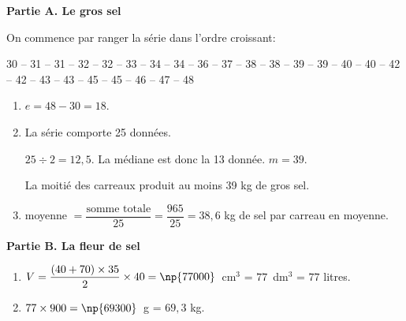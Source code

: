 
\medskip

\textbf{Partie A. Le gros sel}

\medskip

On commence par ranger la série dans l'ordre croissant:

30 -- 31 -- 31 -- 32 -- 32 -- 33 -- 34 -- 34 -- 36 -- 37 -- 38 -- 38 -- 39 -- 39 -- 40 -- 40 -- 42 -- 42 -- 43 -- 43 -- 45 -- 45 -- 46 -- 47 -- 48

\medskip

\begin{enumerate}
\item $e = 48 - 30 = 18$.
\item La série comporte 25 données.

$25 \div 2 = 12,5$. La médiane est donc la 13 donnée. $m = 39$.

La moitié des carreaux produit au moins 39 kg de gros sel.
\item  moyenne $= \dfrac{\text{somme totale}}{25} = \dfrac{965}{25} = 38,6$ kg de sel par carreau en moyenne.
\end{enumerate}

\bigskip

\textbf{Partie B. La fleur de sel}

\medskip

\begin{enumerate}
\item $V = \dfrac{(40 + 70) \times 35}{2} \times  40 = \np{77000}$~cm$^3$ = $77$~dm$^3$ = $77$ litres.
\item $77 \times  900 = \np{69300}$~g = $69,3$ kg.
\end{enumerate}

\vspace{0,5cm}

